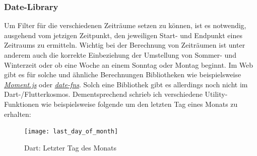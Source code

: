 \subsubsection{Date-Library}

Um Filter für die verschiedenen Zeiträume setzen zu können,
ist es notwendig, ausgehend vom jetzigen Zeitpunkt,
den jeweiligen Start- und Endpunkt eines Zeitraums zu ermitteln.
Wichtig bei der Berechnung von Zeiträumen ist unter anderem auch
die korrekte Einbeziehung der Umstellung von Sommer- und Winterzeit
oder ob eine Woche an einem Sonntag oder Montag beginnt.
Im Web gibt es für solche und ähnliche Berechnungen Bibliotheken
wie beispielsweise \href{https://momentjs.com/docs/}{\textit{Moment.js}}
oder \href{https://date-fns.org/}{\textit{date-fns}}.
Solch eine Bibliothek gibt es allerdings noch nicht im Dart-/Flutterkosmos.
Dementsprechend schrieb ich verschiedene Utility-Funktionen wie
beispielsweise folgende um den letzten Tag eines Monats zu erhalten:
\begin{figure}[H]
    \centering
    \texttt{[image: last\_day\_of\_month]}
    \caption{Dart: Letzter Tag des Monats}
\end{figure}


